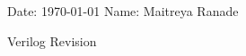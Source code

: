 \documentclass[12pt, a4paper]{article}
\begin{document}
	\onehalfspacing
	Date: \today{} \hfill{} Name: Maitreya Ranade\\
	\begin{center}
		\vspace*{\fill}
		{\LARGE Verilog Revision}
		\vspace*{\fill}
	\end{center}
	
	\pagebreak
	
    
	
\end{document}
